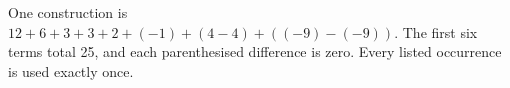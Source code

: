 One construction is $\boxed{12+6+3+3+2+(-1)+(4-4)+((-9)-(-9))}$. The first six terms total 25, and each parenthesised difference is zero. Every listed occurrence is used exactly once.
